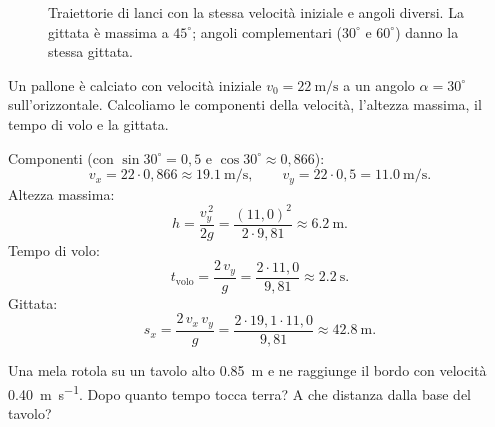 \begin{figure}[!htbp]
    \centering
    \caption{Traiettorie di lanci con la stessa velocità iniziale e angoli diversi. La gittata è massima a $45^\circ $; angoli complementari ($30^\circ $ e $60^\circ $) danno la stessa gittata.}
    \label{fig:gittata-angoli}
\end{figure}

\begin{testexample}
Un pallone è calciato con velocità iniziale $v_0 = \SI{22}{\metre\per\second}$ a un angolo $\alpha = 30^\circ $ sull'orizzontale. Calcoliamo le componenti della velocità, l'altezza massima, il tempo di volo e la gittata.

Componenti (con $\sin 30^\circ  = 0,5$ e $\cos 30^\circ  \approx 0,866$):
\[ v_x = 22 \cdot 0,866 \approx \SI{19,1}{\metre\per\second}, \qquad v_y = 22 \cdot 0,5 = \SI{11,0}{\metre\per\second}. \]
Altezza massima:
\[ h = \frac{v_y^{\,2}}{2g} = \frac{(11,0)^2}{2 \cdot 9{,}81} \approx \SI{6,2}{\metre}. \]
Tempo di volo:
\[ t_{\text{volo}} = \frac{2\,v_y}{g} = \frac{2 \cdot 11,0}{9{,}81} \approx \SI{2,2}{\second}. \]
Gittata:
\[ s_x = \frac{2\,v_x\,v_y}{g} = \frac{2 \cdot 19,1 \cdot 11,0}{9{,}81} \approx \SI{42,8}{\metre}. \]
\end{testexample}

\begin{esercizio}
Una mela rotola su un tavolo alto \SI{0,85}{\metre} e ne raggiunge il bordo con velocità \SI{0,40}{\metre\per\second}. Dopo quanto tempo tocca terra? A che distanza dalla base del tavolo?\\
\end{esercizio}

